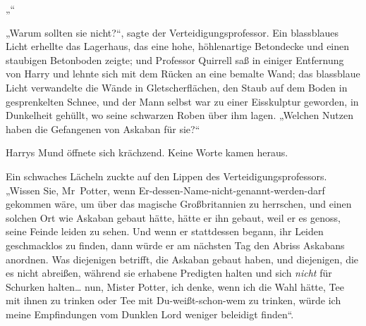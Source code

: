 „“

„Warum sollten sie nicht?“, sagte der Verteidigungsprofessor. Ein blassblaues Licht erhellte das Lagerhaus, das eine hohe, höhlenartige Betondecke und einen staubigen Betonboden zeigte; und Professor Quirrell saß in einiger Entfernung von Harry und lehnte sich mit dem Rücken an eine bemalte Wand; das blassblaue Licht verwandelte die Wände in Gletscherflächen, den Staub auf dem Boden in gesprenkelten Schnee, und der Mann selbst war zu einer Eisskulptur geworden, in Dunkelheit gehüllt, wo seine schwarzen Roben über ihm lagen. „Welchen Nutzen haben die Gefangenen von Askaban für sie?“

Harrys Mund öffnete sich krächzend. Keine Worte kamen heraus.

Ein schwaches Lächeln zuckte auf den Lippen des Verteidigungsprofessors. „Wissen Sie, Mr~Potter, wenn Er-dessen-Name-nicht-genannt-werden-darf gekommen wäre, um über das magische Großbritannien zu herrschen, und einen solchen Ort wie Askaban gebaut hätte, hätte er ihn gebaut, weil er es genoss, seine Feinde leiden zu sehen. Und wenn er stattdessen begann, ihr Leiden geschmacklos zu finden, dann würde er am nächsten Tag den Abriss Askabans anordnen. Was diejenigen betrifft, die Askaban gebaut haben, und diejenigen, die es nicht abreißen, während sie erhabene Predigten halten und sich \emph{nicht} für Schurken halten… nun, Mister Potter, ich denke, wenn ich die Wahl hätte, Tee mit ihnen zu trinken oder Tee mit Du-weißt-schon-wem zu trinken, würde ich meine Empfindungen vom Dunklen Lord weniger beleidigt finden“.

